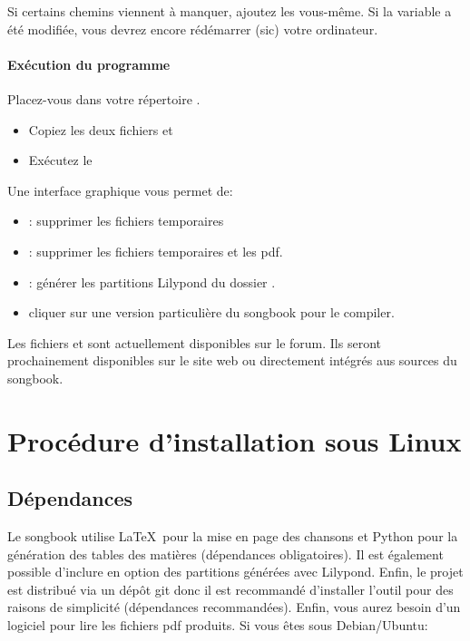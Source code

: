 \documentclass[versionenligne]{patacrep}
\newcommand{\Touche}[1]{\Ovalbox{#1}}
\begin{document}
Si certains chemins viennent à manquer, ajoutez les vous-même. Si la
variable a été modifiée, vous devrez encore rédémarrer (sic) votre
ordinateur.

\paragraph{Exécution du programme}
Placez-vous dans votre répertoire .
\begin{itemize}
\item Copiez les deux fichiers  et 
\item Exécutez le 
\end{itemize}

 Une interface graphique vous permet de:
\begin{itemize}
\item \Touche{Clean}: supprimer les fichiers temporaires
\item \Touche{Clean All}: supprimer les fichiers temporaires et les pdf. 
\item \Touche{Make Lilypond}: générer les partitions Lilypond du dossier .
\item cliquer sur une version particulière du songbook pour le compiler.
\end{itemize}

\begin{nota}
  Les fichiers  et  sont actuellement disponibles sur le forum. Ils seront prochainement disponibles sur le site web ou directement intégrés aus sources du songbook.
\end{nota}

\section{Procédure d'installation sous Linux}

\subsection{Dépendances}\label{sec:songbook-dep}

Le songbook utilise \LaTeX\, pour la mise en page des chansons et Python
pour la génération des tables des matières (dépendances obligatoires).
Il est également possible d'inclure en option des partitions générées
avec Lilypond. Enfin, le projet est distribué via un dépôt git donc il
est recommandé d'installer l'outil pour des raisons de simplicité
(dépendances recommandées). Enfin, vous aurez besoin d'un logiciel
pour lire les fichiers pdf produits. Si vous êtes sous Debian/Ubuntu:
\end{document}
